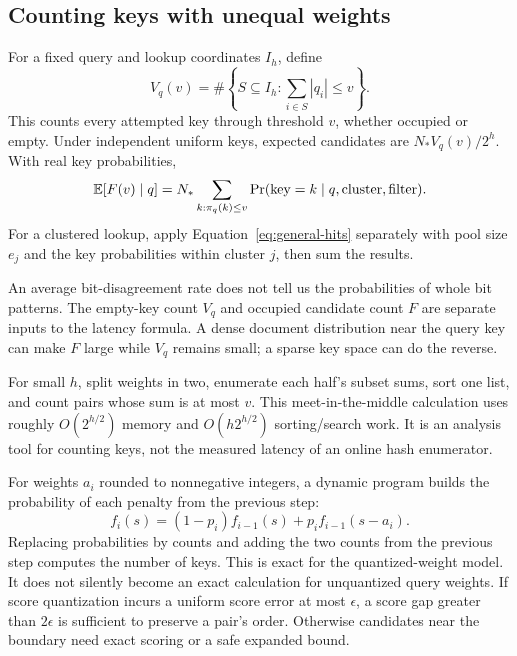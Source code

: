 \subsection{Counting keys with unequal weights}
For a fixed query and lookup coordinates $I_h$, define
\begin{equation}
V_q(v)=\#\left\{S\subseteq I_h:\sum_{i\in S}|q_i|\leq v\right\}.
\label{eq:weighted-volume}
\end{equation}
This counts every attempted key through threshold $v$, whether occupied or empty. Under
independent uniform keys, expected candidates are $N_*V_q(v)/2^h$. With real key probabilities,
\begin{equation}
\mathbb E[F(v)\mid q]=N_*\sum_{k:\pi_q(k)\leq v}\Pr(\text{key}=k\mid q,\text{cluster},\text{filter}).
\label{eq:general-hits}
\end{equation}
For a clustered lookup, apply Equation~\eqref{eq:general-hits} separately with pool size $e_j$ and the key probabilities within cluster $j$, then sum the results.

An average bit-disagreement rate does not tell us the probabilities of whole bit patterns.
The empty-key count $V_q$ and occupied candidate count $F$ are separate inputs to the latency
formula. A dense document distribution near the query key can make $F$ large while $V_q$
remains small; a sparse key space can do the reverse.

For small $h$, split weights in two, enumerate each half's subset sums, sort one list, and
count pairs whose sum is at most $v$. This meet-in-the-middle calculation uses roughly
$O(2^{h/2})$ memory and $O(h2^{h/2})$ sorting/search work. It is an analysis tool for counting
keys, not the measured latency of an online hash enumerator.

For weights $a_i$ rounded to nonnegative integers, a dynamic program builds the probability of each penalty from the previous step:
\begin{equation}
f_{i}(s)=(1-p_i)f_{i-1}(s)+p_i f_{i-1}(s-a_i).
\label{eq:dp}
\end{equation}
Replacing probabilities by counts and adding the two counts from the previous step computes the number of keys.
This is exact for the quantized-weight model. It does not silently become an exact calculation
for unquantized query weights. If score quantization incurs a uniform score error at most
$\epsilon$, a score gap greater than $2\epsilon$ is sufficient to preserve a pair's order.
Otherwise candidates near the boundary need exact scoring or a safe expanded bound.

